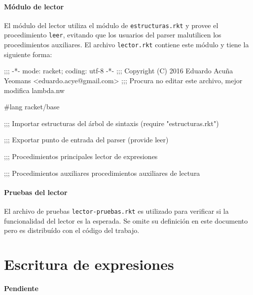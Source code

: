 \documentclass[letterpaper,twoside,openright,10pt]{book}
\begin{document}
\nwenddocs{}\paragraph{Módulo de lector} El módulo del lector utiliza el módulo de {\tt{}estructuras.rkt} y provee el procedimiento {\tt{}\protect{}leer}, evitando que los usuarios del parser malutilicen los procedimientos auxiliares. El archivo {\tt{}lector.rkt} contiene este módulo y tiene la siguiente forma:

\nwenddocs{}\endmoddef
;;; -*- mode: racket; coding: utf-8 -*-
;;; Copyright (C) 2016 Eduardo Acuña Yeomans <eduardo.acye@gmail.com>
;;; Procura no editar este archivo, mejor modifica lambda.nw

#lang racket/base

;;; Importar estructuras del árbol de sintaxis
(require "estructuras.rkt")

;;; Exportar punto de entrada del parser
(provide leer)

;;; Procedimientos principales
\LA{}lector de expresiones~{\nwtagstyle{}}\RA{}

;;; Procedimientos auxiliares
\LA{}procedimientos auxiliares de lectura~{\nwtagstyle{}}\RA{}
\nwendcode{}\nwdocspar

\nwenddocs{}\paragraph{Pruebas del lector} El archivo de pruebas {\tt{}lector-pruebas.rkt} es utilizado para verificar si la funcionalidad del lector es la esperada. Se omite su definición en este documento pero es distribuído con el código del trabajo.

\nwenddocs{}\section*{Escritura de expresiones}

\paragraph{Pendiente}
\end{document}
